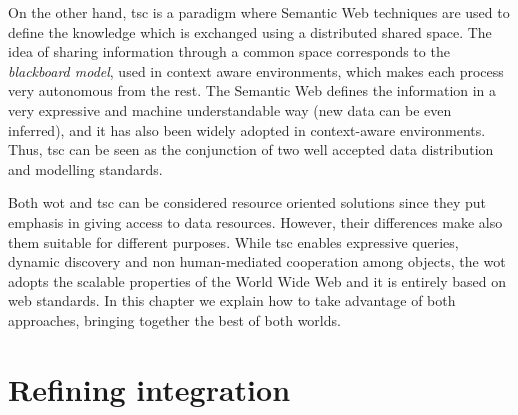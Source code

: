 On the other hand, \ac{tsc} is a paradigm where Semantic Web techniques are used to define the knowledge which is exchanged using a distributed shared space.
The idea of sharing information through a common space corresponds to the \textit{blackboard model}, used in context aware environments, which makes each process very autonomous from the rest.
The Semantic Web defines the information in a very expressive and machine understandable way (new data can be even inferred), and it has also been widely adopted in context-aware environments.
Thus, \ac{tsc} can be seen as the conjunction of two well accepted data distribution and modelling standards.

Both \ac{wot} and \ac{tsc} can be considered resource oriented solutions since they put emphasis in giving access to data resources.
However, their differences make also them suitable for different purposes.
While \ac{tsc} enables expressive queries, dynamic discovery and non human-mediated cooperation among objects, the \ac{wot} adopts the scalable properties of the World Wide Web and it is entirely based on web standards.
In this chapter we explain how to take advantage of both approaches, bringing together the best of both worlds.




\section{Refining integration} %


